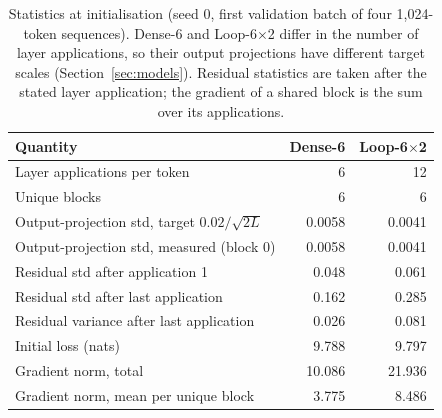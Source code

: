 \begin{table}[t]
\centering
\caption{Statistics at initialisation (seed 0, first validation batch of four 1,024-token sequences). Dense-6 and Loop-6$\times$2 differ in the number of layer applications, so their output projections have different target scales (Section~\ref{sec:models}). Residual statistics are taken after the stated layer application; the gradient of a shared block is the sum over its applications.}
\label{tab:init}
\footnotesize
\setlength{\tabcolsep}{4pt}
\begin{tabular}{lrr}
\toprule
Quantity & Dense-6 & Loop-6$\times$2 \\
\midrule
Layer applications per token & 6 & 12 \\
Unique blocks & 6 & 6 \\
Output-projection std, target $0.02/\sqrt{2L}$ & 0.0058 & 0.0041 \\
Output-projection std, measured (block 0) & 0.0058 & 0.0041 \\
Residual std after application 1 & 0.048 & 0.061 \\
Residual std after last application & 0.162 & 0.285 \\
Residual variance after last application & 0.026 & 0.081 \\
Initial loss (nats) & 9.788 & 9.797 \\
Gradient norm, total & 10.086 & 21.936 \\
Gradient norm, mean per unique block & 3.775 & 8.486 \\
\bottomrule
\end{tabular}
\end{table}
